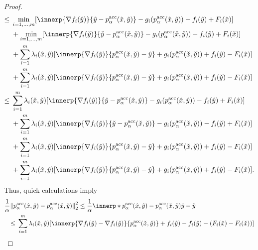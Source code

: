 \documentclass[../main]{subfiles}
\begin{document}
\begin{proof}
\begin{align}
        \le{}& \min_{i = 1, \dots, m} [\innerp{\nabla f_i(\hat{y})}{\hat{y} - p^\acc_\alpha(\hat{x}, \hat{y})} - g_i(p^\acc_\alpha(\hat{x}, \hat{y})) - f_i(\hat{y}) + F_i(\hat{x})] \\ 
                &+ \min_{i = 1, \dots, m} [\innerp{\nabla f_i(\check{y})}{\check{y} - p^\acc_\alpha(\check{x}, \check{y})} - g_i(p^\acc_\alpha(\check{x}, \check{y})) - f_i(\check{y}) + F_i(\check{x})] \\
                &+ \sum_{i = 1}^{m} \lambda_i(\hat{x}, \hat{y}) [\innerp{\nabla f_i(\hat{y})}{p^\acc_\alpha(\check{x}, \check{y}) - \hat{y}} + g_i(p^\acc_\alpha(\check{x}, \check{y})) + f_i(\hat{y}) - F_i(\hat{x})] \\
                &+ \sum_{i = 1}^{m} \lambda_i(\check{x}, \check{y}) [\innerp{\nabla f_i(\check{y})}{p^\acc_\alpha(\hat{x}, \hat{y}) - \check{y}} + g_i(p^\acc_\alpha(\hat{x}, \hat{y})) + f_i(\check{y}) - F_i(\check{x})] \\
        \le{}& \sum_{i = 1}^{m} \lambda_i(\check{x}, \check{y}) [\innerp{\nabla f_i(\hat{y})}{\hat{y} - p^\acc_\alpha(\hat{x}, \hat{y})} - g_i(p^\acc_\alpha(\hat{x}, \hat{y})) - f_i(\hat{y}) + F_i(\hat{x})] \\ 
                &+ \sum_{i = 1}^{m} \lambda_i(\hat{x}, \hat{y}) [\innerp{\nabla f_i(\check{y})}{\check{y} - p^\acc_\alpha(\check{x}, \check{y})} - g_i(p^\acc_\alpha(\check{x}, \check{y})) - f_i(\check{y}) + F_i(\check{x})] \\
                &+ \sum_{i = 1}^{m} \lambda_i(\hat{x}, \hat{y}) [\innerp{\nabla f_i(\hat{y})}{p^\acc_\alpha(\check{x}, \check{y}) - \hat{y}} + g_i(p^\acc_\alpha(\check{x}, \check{y})) + f_i(\hat{y}) - F_i(\hat{x})] \\
                &+ \sum_{i = 1}^{m} \lambda_i(\check{x}, \check{y}) [\innerp{\nabla f_i(\check{y})}{p^\acc_\alpha(\hat{x}, \hat{y}) - \check{y}} + g_i(p^\acc_\alpha(\hat{x}, \hat{y})) + f_i(\check{y}) - F_i(\check{x})] 
    .\end{align}
    Thus, quick calculations imply
    \begin{align}
    \MoveEqLeft \frac{1}{\alpha} \norm*{p^\acc_\alpha(\hat{x}, \hat{y}) - p^\acc_\alpha(\check{x}, \check{y})}_2^2 \le \frac{1}{\alpha} \innerp*{p^\acc_\alpha(\hat{x}, \hat{y}) - p^\acc_\alpha(\check{x}, \check{y})}{\hat{y} - \check{y}} \\
    \le{}& \sum_{i = 1}^{m} \lambda_i(\hat{x}, \hat{y}) [\innerp{\nabla f_i(\hat{y}) - \nabla f_i(\check{y})}{p^\acc_\alpha(\check{x}, \check{y})} + f_i(\hat{y}) - f_i(\check{y}) - (F_i(\hat{x}) - F_i(\check{x}))] \\

\end{align}
\end{proof}
\end{document}
